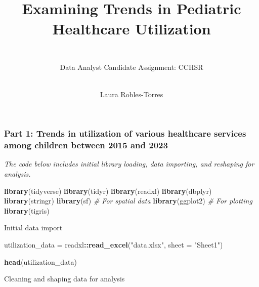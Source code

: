 \documentclass[
]{article}
\title{\strut \\
Examining Trends in Pediatric Healthcare Utilization\\}
\subtitle{\\
Data Analyst Candidate Assignment: CCHSR\\}
\author{\strut \\
Laura Robles-Torres\\}
\date{\strut \\
February 18, 2025\\}
\newenvironment{Shaded}{\begin{snugshade}}{\end{snugshade}}
\newcommand{\AttributeTok}[1]{\textcolor[rgb]{0.13,0.29,0.53}{#1}}
\newcommand{\CommentTok}[1]{\textcolor[rgb]{0.56,0.35,0.01}{\textit{#1}}}
\newcommand{\FunctionTok}[1]{\textcolor[rgb]{0.13,0.29,0.53}{\textbf{#1}}}
\newcommand{\NormalTok}[1]{#1}
\newcommand{\OtherTok}[1]{\textcolor[rgb]{0.56,0.35,0.01}{#1}}
\newcommand{\SpecialCharTok}[1]{\textcolor[rgb]{0.81,0.36,0.00}{\textbf{#1}}}
\newcommand{\StringTok}[1]{\textcolor[rgb]{0.31,0.60,0.02}{#1}}
\begin{document}
\maketitle

\hypertarget{part-1-trends-in-utilization-of-various-healthcare-services-among-children-between-2015-and-2023}{%
\subsubsection{Part 1: Trends in utilization of various healthcare
services among children between 2015 and
2023}\label{part-1-trends-in-utilization-of-various-healthcare-services-among-children-between-2015-and-2023}}

\emph{The code below includes initial library loading, data importing,
and reshaping for analysis.}

\begin{Shaded}
\begin{Highlighting}[]
\FunctionTok{library}\NormalTok{(tidyverse)}
\FunctionTok{library}\NormalTok{(tidyr)}
\FunctionTok{library}\NormalTok{(readxl)}
\FunctionTok{library}\NormalTok{(dbplyr)}
\FunctionTok{library}\NormalTok{(stringr)}
\FunctionTok{library}\NormalTok{(sf)       }\CommentTok{\# For spatial data}
\FunctionTok{library}\NormalTok{(ggplot2)  }\CommentTok{\# For plotting}
\FunctionTok{library}\NormalTok{(tigris) }
\end{Highlighting}
\end{Shaded}

Initial data import

\begin{Shaded}
\begin{Highlighting}[]
\NormalTok{utilization\_data }\OtherTok{=}
\NormalTok{    readxl}\SpecialCharTok{::}\FunctionTok{read\_excel}\NormalTok{(}\StringTok{"data.xlsx"}\NormalTok{, }\AttributeTok{sheet =} \StringTok{"Sheet1"}\NormalTok{)}

\FunctionTok{head}\NormalTok{(utilization\_data)}
\end{Highlighting}
\end{Shaded}

Cleaning and shaping data for analysis
\end{document}
